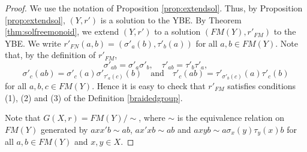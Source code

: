 \begin{proof}
We use the notation of Proposition \ref{prop:extendsol}. Thus, by Proposition \ref{prop:extendsol}, $(Y,r')$ is a solution to the YBE. By Theorem \ref{thm:solfreemonoid}, we extend $(Y,r')$ to a solution $(FM(Y),r'_{FM})$ to the YBE. We write $r'_{FN}(a,b)=(\sigma'_a(b),\tau'_b(a))$ for all $a,b\in FM(Y)$. Note that, by the definition of $r'_{FM}$,
\[\sigma'_{ab}=\sigma'_a\sigma'_b,\quad \tau'_{ab}=\tau'_b\tau'_a,\]
\[\sigma'_c(ab)=\sigma'_c(a)\sigma'_{\tau'_a(c)}(b)\quad\text{and}\quad
\tau'_c(ab)=\tau'_{\sigma'_b(c)}(a)\tau'_c(b)\]
for all $a,b,c\in FM(Y)$. Hence it is easy to check that $r'_{FM}$ satisfies conditions (1), (2) and (3) of the Definition \ref{braidedgroup}. 

Note that $G(X,r)=FM(Y)/\sim$, where $\sim$ is the equivalence relation on $FM(Y)$ generated by $axx'b\sim ab$, $ax'xb\sim ab$ and $axyb\sim a\sigma_x(y)\tau_y(x)b$ for all $a,b\in FM(Y)$ and $x,y\in X$.


\end{proof}
